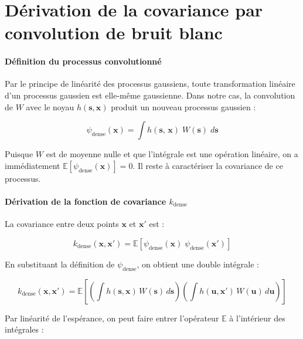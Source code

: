\section{Dérivation de la covariance par convolution de bruit blanc}
\label{ann:derivation-se}

\paragraph{Définition du processus convolutionné}

Par le principe de linéarité des processus gaussiens, toute transformation linéaire d'un processus gaussien est elle-même gaussienne. Dans notre cas, la convolution de $W$ avec le noyau $h(\mathbf{s}, \mathbf{x})$ produit un nouveau processus gaussien :

\begin{equation}
\psi_{\text{dense}}(\mathbf{x}) = \int h(\mathbf{s},\, \mathbf{x})\; W(\mathbf{s})\; d\mathbf{s}
\end{equation}

Puisque $W$ est de moyenne nulle et que l'intégrale est une opération linéaire, on a immédiatement $\mathbb{E}[\psi_{\text{dense}}(\mathbf{x})] = 0$. Il reste à caractériser la covariance de ce processus.

\paragraph{Dérivation de la fonction de covariance $k_{\text{dense}}$}

La covariance entre deux points $\mathbf{x}$ et $\mathbf{x}'$ est :

\begin{equation}
k_{\text{dense}}(\mathbf{x},\mathbf{x}') = \mathbb{E}\!\left[\psi_{\text{dense}}(\mathbf{x})\;\psi_{\text{dense}}(\mathbf{x}')\right]
\end{equation}

En substituant la définition de $\psi_{\text{dense}}$, on obtient une double intégrale :

\begin{equation}
k_{\text{dense}}(\mathbf{x},\mathbf{x}') = \mathbb{E}\!\left[\left(\int h(\mathbf{s}, \mathbf{x})\, W(\mathbf{s})\, d\mathbf{s}\right) \left(\int h(\mathbf{u}, \mathbf{x}')\, W(\mathbf{u})\, d\mathbf{u}\right)\right]
\end{equation}

Par linéarité de l'espérance, on peut faire entrer l'opérateur $\mathbb{E}$ à l'intérieur des intégrales :

